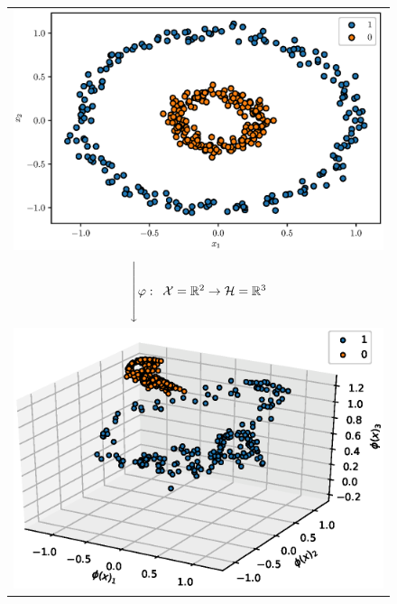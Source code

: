\begin{figure}
    \centering
    \begin{tabular}{c}
        \includegraphics[valign=m, width=.5\textheight]{./gfx/input.eps} \\
        $\xdownarrow{1cm} \phi: \enskip \mathcal{X} = \mathbb{R}^2 \to
        \mathcal{H} = \mathbb{R}^3$ \\
        \includegraphics[valign=m, width=.5\textheight]{./gfx/feature.eps}

\end{tabular}
\end{figure}
